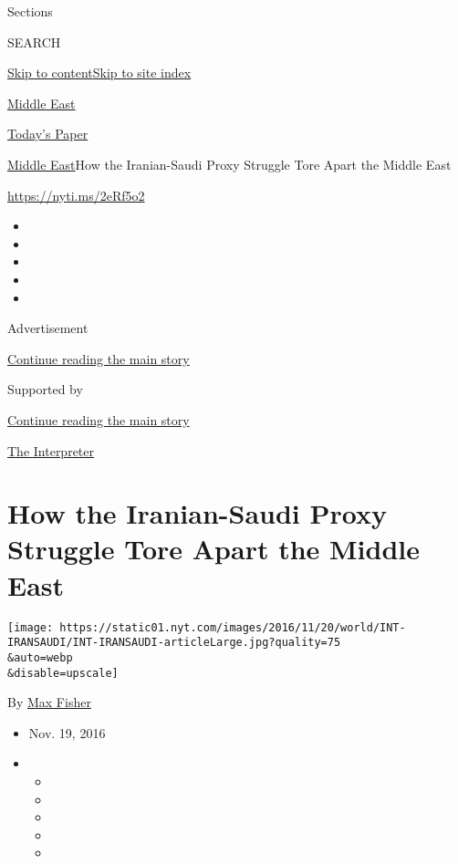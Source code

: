 Sections

SEARCH

\protect\hyperlink{site-content}{Skip to
content}\protect\hyperlink{site-index}{Skip to site index}

\href{https://www.nytimes.com/section/world/middleeast}{Middle East}

\href{https://myaccount.nytimes.com/auth/login?response_type=cookie\&client_id=vi}{}

\href{https://www.nytimes.com/section/todayspaper}{Today's Paper}

\href{/section/world/middleeast}{Middle East}\textbar{}How the
Iranian-Saudi Proxy Struggle Tore Apart the Middle East

\url{https://nyti.ms/2eRf5o2}

\begin{itemize}
\item
\item
\item
\item
\item
\end{itemize}

Advertisement

\protect\hyperlink{after-top}{Continue reading the main story}

Supported by

\protect\hyperlink{after-sponsor}{Continue reading the main story}

\href{/column/the-interpreter}{The Interpreter}

\hypertarget{how-the-iranian-saudi-proxy-struggle-tore-apart-the-middle-east}{%
\section{How the Iranian-Saudi Proxy Struggle Tore Apart the Middle
East}\label{how-the-iranian-saudi-proxy-struggle-tore-apart-the-middle-east}}

\texttt{[image: https://static01.nyt.com/images/2016/11/20/world/INT-IRANSAUDI/INT-IRANSAUDI-articleLarge.jpg?quality=75\\\&auto=webp\\\&disable=upscale]}

By \href{https://www.nytimes.com/by/max-fisher}{Max Fisher}

\begin{itemize}
\item
  Nov. 19, 2016
\item
  \begin{itemize}
  \item
  \item
  \item
  \item
  \item
  \end{itemize}
\end{itemize}

